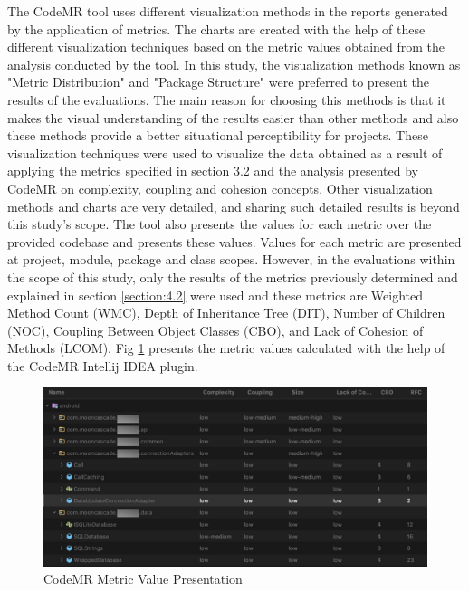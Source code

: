 The CodeMR tool uses different visualization methods in the reports generated by the application of metrics. The charts are created with the help of these different visualization techniques based on the metric values obtained from the analysis conducted by the tool. In this study, the visualization methods known as "Metric Distribution" and "Package Structure" were preferred to present the results of the evaluations. The main reason for choosing this methods is that it makes the visual understanding of the results easier than other methods and also these methods provide a better situational perceptibility for projects. These visualization techniques were used to visualize the data obtained as a result of applying the metrics specified in section 3.2 and the analysis presented by CodeMR on complexity, coupling and cohesion concepts. Other visualization methods and charts are very detailed, and sharing such detailed results is beyond this study's scope. The tool also presents the values for each metric over the provided codebase and presents these values. Values for each metric are presented at project, module, package and class scopes. However, in the evaluations within the scope of this study, only the results of the metrics previously determined and explained in section \ref{section:4.2} were used and these metrics are Weighted Method
Count (WMC), Depth of Inheritance Tree (DIT), Number of Children (NOC), Coupling Between Object Classes (CBO), and Lack of Cohesion of Methods (LCOM). Fig \ref{fig:code-mr-metric-val} presents the metric values calculated with the help of the CodeMR Intellij IDEA plugin.
\begin{figure}[ht!]
    \centering
    \includegraphics[scale=0.35]{figures/code-mr-metric-val.png}
    \caption{CodeMR Metric Value Presentation}
    \label{fig:code-mr-metric-val}
\end{figure}
\FloatBarrier

